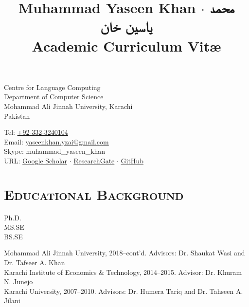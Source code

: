 \documentclass[a4paper, 10pt]{article}
\title{{\Huge\bf Muhammad Yaseen Khan} $\cdot$ {\huge\bf\texturdu{محمد یاسین خان}}\\\small Academic Curriculum Vit\ae}
\author{}
\date{}
\begin{document}
\maketitle
\vspace{-3em}
\begin{minipage}{0.45\textwidth}
Centre for Language Computing\\
Department of Computer Science\\
Mohammad Ali Jinnah University, Karachi\\
Pakistan
\end{minipage}
\hfill
\begin{minipage}{0.45\textwidth}
Tel: \href{tel:+923323240104}{+92-332-3240104}\\
Email: \href{mailto:yaseenkhan.yzai@gmail.com}{yaseenkhan.yzai@gmail.com}\\
Skype: muhammad\_yaseen\_khan\\
URL: \href{https://scholar.google.com/citations?user=a_d2KTEAAAAJ&hl=en}{Google Scholar} $\cdot$ \href{https://www.researchgate.net/profile/Muhammad_Yaseen_Khan}{ResearchGate} $\cdot$ \href{https://www.github.com/MuhammadYaseenKhan}{GitHub}
\end{minipage}


\section*{\normalfont\textsc{Educational Background}}
\hfill\begin{minipage}{0.09\textwidth}
Ph.D.\\
MS.SE\\
BS.SE
\end{minipage}%
\begin{minipage}{0.89\textwidth}
Mohammad Ali Jinnah University, 2018--cont'd. 
Advisors: Dr. Shaukat Wasi and Dr. Tafseer A. Khan\\
Karachi Institute of Economics \& Technology, 2014--2015. Advisor: Dr. Khuram N. Junejo\\
Karachi University, 2007--2010. Advisors: Dr. Humera Tariq and Dr. Tahseen A. Jilani
\end{minipage}

\end{document}
